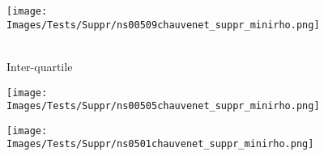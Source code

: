 \documentclass[a4paper,12pt]{article} %
\begin{document}
                
        \begin{figure}[H] %
            \texttt{[image: Images/Tests/Suppr/ns00509chauvenet\_suppr\_minirho.png]} %
            \caption{\\Inter-quartile} %
            \label{m15} %
            \endminipage
            \hfill
            \endminipage
            \texttt{[image: Images/Tests/Suppr/ns00505chauvenet\_suppr\_minirho.png]}  
            \caption{}
            \label{m5}
            \endminipage
            \hfill
            \endminipage
            \texttt{[image: Images/Tests/Suppr/ns0501chauvenet\_suppr\_minirho.png]}                                            
            \caption{}
            \label{m35}
            \endminipage
        \end{figure}
\end{document}
